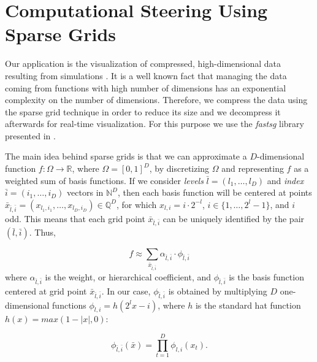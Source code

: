 \section{Computational Steering Using Sparse Grids}
\label{sec:comp_steering}

Our application is the visualization of compressed, high-dimensional data
resulting from simulations \cite{Butnaru201156}. It is a well known fact that
managing the data coming from functions with high number of dimensions has an
exponential complexity on the number of dimensions. Therefore, we compress the
data using the sparse grid technique in order to reduce its size and we
decompress it afterwards for real-time visualization. For this purpose we use
the \textit{fastsg} library presented in \cite{murarasu12fastsg:}.

The main idea behind sparse grids is that we can approximate a $D$-dimensional
function $f : \Omega \rightarrow \mathbb{R}$, where $\Omega = [0, 1]^{D}$, by
discretizing $\Omega$ and representing $f$ as a weighted sum of basis functions.
If we consider \textit{levels} $\bar{l} = (l_{1},\ldots,l_{D})$ and
\textit{index} $\bar{i} = (i_{1},\ldots,i_{D})$ vectors in $\mathbb{N}^{D}$,
then each basis function will be centered at points $\bar{x}_{\bar{l},\bar{i}} =
(x_{l_{1},i_{1}},\ldots,x_{l_{D},i_{D}}) \in \mathbb{Q}^{D}$, for which $x_{l,i}
= i \cdot 2^{-l}$, $i \in \{1,\ldots,2^{l} - 1\}$, and $i$ odd. This means that
each grid point $\bar{x}_{\bar{l},\bar{i}}$ can be uniquely identified by the
pair $(\bar{l},\bar{i})$. Thus,

\[ f \approx \sum_{\bar{x}_{\bar{l},\bar{i}}} \alpha_{\bar{l},\bar{i}} \cdot
\phi_{\bar{l},\bar{i}} \]
where $\alpha_{\bar{l},\bar{i}}$ is the weight, or hierarchical coefficient, and
$\phi_{\bar{l},\bar{i}}$ is the basis function centered at grid point
$\bar{x}_{\bar{l},\bar{i}}$. In our case, $\phi_{\bar{l},\bar{i}}$ is obtained
by multiplying $D$ one-dimensional functions $\phi_{l,i} = h(2^{l}x - i)$, where
$h$ is the standard hat function $h(x) = max(1 - |x|, 0)$:

\[ \phi_{\bar{l},\bar{i}}(\bar{x}) = \prod_{t=1}^{D} \phi_{l,i}(x_{t}) .\]

